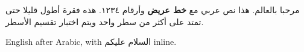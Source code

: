 \documentclass{article}
\begin{document}
\begin{arabic}
مرحبا بالعالم. هذا نص عربي مع \textbf{خط عريض} وأرقام ١٢٣٤. هذه فقرة
أطول قليلا حتى تمتد على أكثر من سطر واحد ويتم اختبار تقسيم الأسطر.
\end{arabic}

English after Arabic, with \textarabic{السلام عليكم} inline.
\end{document}
